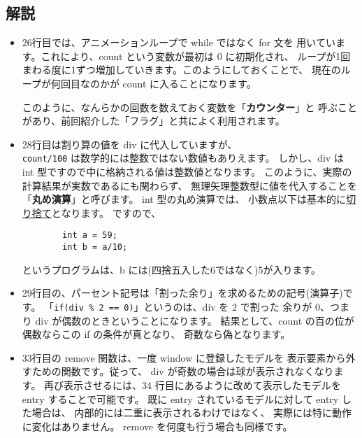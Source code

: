 \subsection*{解説}
\begin{itemize}
 \item 26行目では、アニメーションループで while ではなく for 文を
	用いています。これにより、count という変数が最初は 0 に初期化され、
	ループが1回まわる度に1ずつ増加していきます。このようにしておくことで、
	現在のループが何回目なのかが count に入ることになります。

	このように、なんらかの回数を数えておく変数を「\textbf{カウンター}」と
	呼ぶことがあり、前回紹介した「フラグ」と共によく利用されます。

 \item 28行目は割り算の値を div に代入していますが、\\
	\verb+count/100+ は数学的には整数ではない数値もありえます。
	しかし、div は int 型ですので中に格納される値は整数値となります。
	このように、実際の計算結果が実数であるにも関わらず、
	無理矢理整数型に値を代入することを「\textbf{丸め演算}」と呼びます。
	int 型の丸め演算では、
	小数点以下は基本的に\underline{切り捨て}となります。
	ですので、
	\begin{screen}
	\begin{verbatim}
	    int a = 59;
	    int b = a/10;
	\end{verbatim}
	\end{screen}
	というプログラムは、b には(四捨五入した6ではなく)5が入ります。

 \item 29行目の、パーセント記号は「割った余り」を求めるための記号(演算子)です。
	「\verb+if(div % 2 == 0)+」というのは、div を 2 で割った
	余りが 0、つまり div が偶数のときということになります。
	結果として、count の百の位が偶数ならこの if の条件が真となり、
	奇数なら偽となります。

 \item 33行目の remove 関数は、一度 window に登録したモデルを
	表示要素から外すための関数です。従って、
	div が奇数の場合は球が表示されなくなります。
	再び表示させるには、34 行目にあるように改めて表示したモデルを
	entry することで可能です。
	既に entry されているモデルに対して entry した場合は、
	内部的には二重に表示されるわけではなく、
	実際には特に動作に変化はありません。
	remove を何度も行う場合も同様です。
\end{itemize}

